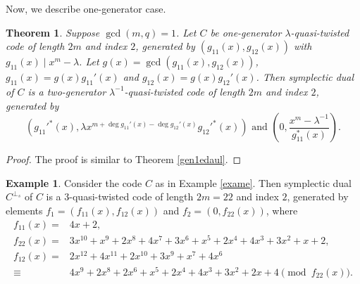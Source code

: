 \documentclass[12 pt]{extarticle}
\numberwithin{equation}{section}
\newtheorem{theorem}{Theorem}[section]
\theoremstyle{definition}
\newtheorem{example}{Example}[section]
\begin{document}
Now, we describe one-generator case.

\begin{theorem}\label{gen1sdaul}
Suppose $\gcd(m,q)=1$. Let $C$ be one-generator $\lambda$-quasi-twisted code of length $2m$ and index $2$, generated by $(g_{11}(x),g_{12}(x))$ with $g_{11}(x)\mid x^m-\lambda$. Let $g(x)=\gcd(g_{11}(x),g_{12}(x))$, $g_{11}(x)=g(x)g_{11}'(x)$ and $g_{12}(x)=g(x)g_{12}'(x)$. Then symplectic dual of $C$ is a two-generator $\lambda^{-1}$-quasi-twisted code of length $2m$ and index $2$, generated by 
 $$  (g_{11}'^*(x), \lambda x^{m+\deg g_{11}'(x)-\deg g_{12}'(x)}g_{12}'^*(x)) \text{ and }\left (0, \frac{x^m-\lambda^{-1}}{g_{11}^*(x)}\right ).$$
\end{theorem}
\begin{proof}
    The proof is similar to Theorem \ref{gen1edaul}.
\end{proof}






\begin{example}
    Consider the code $C$ as in Example \ref{exame}. Then symplectic dual $C^{\perp_s}$ of $C$ is a $3$-quasi-twisted code of length $2m=22$ and index $2$, generated by elements $f_1=(f_{11}(x),f_{12}(x))$ and $f_2=(0,f_{22}(x))$, where
    \begin{equation*}
        \begin{split}
            f_{11}(x)=&4x+2,\\
            f_{22}(x)=&3x^{10} + x^9 + 2x^8 +4x^7 +3x^6 +x^5 +2x^4 +4x^3 +3x^2 +x+2,\\
            f_{12}(x)=&2x^{12} + 4x^{11} + 2x^{10} + 3x^9 + x^7 + 4x^6\\
            \equiv&  4x^9 + 2x^8 + 2x^6 + x^5 + 2x^4 + 4x^3 + 3x^2 + 2x + 4\pmod{f_{22}(x)}.
        \end{split}
    \end{equation*}
\end{example}
\end{document}
